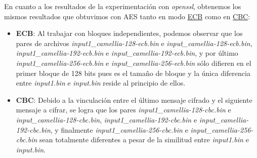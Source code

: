 \documentclass[a4paper, 11pt]{article}
\begin{document}
		En cuanto a los resultados de la experimentación con \textit{openssl}, obtenemos los mismos resultados que obtuvimos
		con AES tanto en modo \hyperref[AES-ECB]{ECB} como en \hyperref[AES-CBC]{CBC}:
		\begin{itemize}
			\item \textbf{ECB}: Al trabajar con bloques independientes, podemos observar que los pares de archivos
			\textit{input1\_camellia-128-ecb.bin} e \textit{input\_camellia-128-ecb.bin}, \textit{input1\_camellia-192-ecb.bin}
			e \textit{input\_camellia-192-ecb.bin}, y por último \textit{input1\_camellia-256-ecb.bin} e
			\textit{input\_camellia-256-ecb.bin} sólo difieren en el primer bloque de 128 bits pues es el tamaño de bloque y
			la única diferencia entre \textit{input1.bin} e \textit{input.bin} reside al principio de ellos.
			
			\item \textbf{CBC}: Debido a la vinculación entre el último mensaje cifrado y el siguiente mensaje a cifrar, se
			logra que los pares \textit{input1\_camellia-128-cbc.bin} e \textit{input\_camellia-128-cbc.bin},
			\textit{input1\_camellia-192-cbc.bin} e \textit{input\_camellia-192-cbc.bin}, y finalmente \textit{input1\_camellia-256-cbc.bin}
			e \textit{input\_camellia-256-cbc.bin} sean totalmente diferentes a pesar de la similitud entre \textit{input1.bin}
			e \textit{input.bin}.
		\end{itemize}
\end{document}
